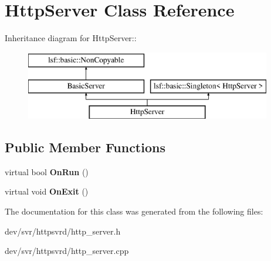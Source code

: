 \hypertarget{classHttpServer}{
\section{HttpServer Class Reference}
\label{classHttpServer}
}
Inheritance diagram for HttpServer::\begin{figure}[H]
\begin{center}
\leavevmode
\includegraphics[height=3cm]{classHttpServer}
\end{center}
\end{figure}
\subsection*{Public Member Functions}
\begin{DoxyCompactItemize}
\item 
\hypertarget{classHttpServer_a368013113d8d8330b00c714096fc31dd}{
virtual bool {\bfseries OnRun} ()}
\label{classHttpServer_a368013113d8d8330b00c714096fc31dd}

\item 
\hypertarget{classHttpServer_ac8360438ce6e6b4eb28869c0dead8493}{
virtual void {\bfseries OnExit} ()}
\label{classHttpServer_ac8360438ce6e6b4eb28869c0dead8493}

\end{DoxyCompactItemize}


The documentation for this class was generated from the following files:\begin{DoxyCompactItemize}
\item 
dev/svr/httpsvrd/http\_\-server.h\item 
dev/svr/httpsvrd/http\_\-server.cpp\end{DoxyCompactItemize}
